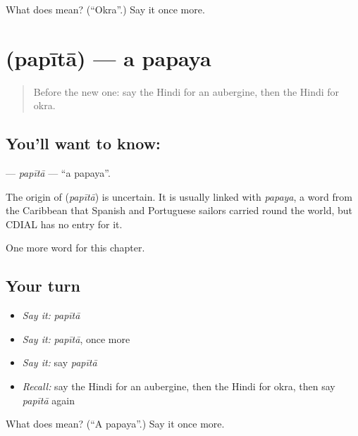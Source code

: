\begin{tcolorbox}[breakable,colback=teal!4,colframe=teal!35!black,title={Before you move on}]
What does  mean? (\textquotedblleft{}Okra\textquotedblright{}.) Say it once more.
\end{tcolorbox}
\section[\texorpdfstring{\hi{पपीता} (papītā)}{पपीता (papītā)}]{ (papītā) — a papaya}

\label{lesson:HI-C216-papita}



\begin{quote}
Before the new one: say the Hindi for an aubergine, then the Hindi for okra.
\end{quote}

\subsection*{You'll want to know: }
\textbf{} — \emph{papītā} — \textquotedblleft{}a papaya\textquotedblright{}.

\begin{cousinweb}
The origin of \textbf{} (\emph{papītā}) is uncertain. It is usually linked with \emph{papaya}, a word from the Caribbean that Spanish and Portuguese sailors carried round the world, but CDIAL has no entry for it.
\end{cousinweb}

\begin{grammarlens}[title={What you've built}]
One more word for this chapter.
\end{grammarlens}

\subsection*{Your turn}
\begin{itemize}
\raggedright
  \item \emph{Say it:} \emph{papītā}
  \item \emph{Say it:} \emph{papītā}, once more
  \item \emph{Say it:} say \emph{papītā}
  \item \emph{Recall:} say the Hindi for an aubergine, then the Hindi for okra, then say \emph{papītā} again
\end{itemize}

\begin{tcolorbox}[breakable,colback=teal!4,colframe=teal!35!black,title={Before you move on}]
What does  mean? (\textquotedblleft{}A papaya\textquotedblright{}.) Say it once more.
\end{tcolorbox}
